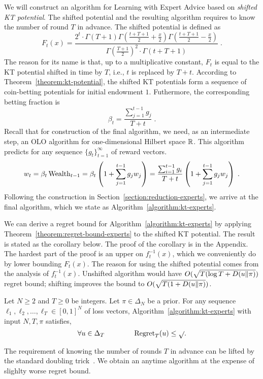 We will construct an algorithm for Learning with Expert Advice based on
\emph{shifted KT potential}. The shifted potential and the resulting algorithm
requires to know the number of round $T$ in advance. The shifted potential is
defined as
$$
F_t(x) = \frac{2^t \cdot \Gamma(T + 1) \Gamma(\frac{t+T+1}{2} + \frac{x}{2}) \Gamma(\frac{t+T+1}{2} - \frac{x}{2})}{\Gamma(\frac{T+1}{2})^2 \cdot \Gamma(t+T+1)} \; .
$$
The reason for its name is that, up to a multiplicative constant, $F_t$ is equal
to the KT potential shifted in time by $T$, i.e., $t$ is replaced by $T+t$.
According to Theorem~\ref{theorem:kt-potential}, the shifted KT potentials form
a sequence of coin-betting potentials for initial endowment $1$. Futhermore, the
corresponding betting fraction is
$$
\beta_t = \frac{\sum_{j=1}^{t-1} g_j}{T+t} \; .
$$
Recall that for construction of the final algorithm, we need, as an intermediate
step, an OLO algorithm for one-dimensional Hilbert space $\mathbb{R}$. This algorithm
predicts for any sequence $\{g_t\}_{t=1}^\infty$ of reward vectors.
$$
w_t
= \beta_t \operatorname{Wealth}_{t-1}
= \beta_t \left(1 + \sum_{j=1}^{t-1} g_j w_j \right)
= \frac{\sum_{i=1}^{t-1} g_i}{T+t} \left(1 + \sum_{j=1}^{t-1} g_j w_j \right) \; .
$$
Following the construction in Section~\ref{section:reduction-experts}, we arrive
at the final algorithm, which we state as Algorithm~\ref{algorithm:kt-experts}.

We can derive a regret bound for Algorithm~\ref{algorithm:kt-experts} by
applying Theorem~\ref{theorem:regret-bound-experts} to the shifted KT potential.
The result is stated as the corollary below. The proof of the corollary is in
the Appendix. The hardest part of the proof is an upper on $f_t^{-1}(x)$, which
we conveniently do by lower bounding $F_t(x)$. The reason for using the shifted
potential comes from the analysis of $f_t^{-1}(x)$. Unshifted algorithm would
have $O(\sqrt{T (\log T + D({u}\|{\pi})})$ regret bound; shifting improves the
bound to $O(\sqrt{T (1 + D({u}\|{\pi})})$.

\begin{corollary}
Let $N \ge 2$ and $T \ge 0$ be integers. Let $\pi \in \Delta_N$ be a prior.
For any sequence $\ell_1, \ell_2, \dots, \ell_T \in
[0,1]^N$ of loss vectors, Algorithm~\ref{algorithm:kt-experts}
with input $N,T,\pi$ satisfies,
$$
\forall u \in \Delta_T \qquad \qquad \operatorname{Regret}_T(u) \le \sqrt{}.
$$
\end{corollary}

The requirement of knowing the number of rounds $T$ in advance can be lifted
by the standard doubling trick~\cite{???}. We obtain an anytime algorithm
at the expense of slighlty worse regret bound.
